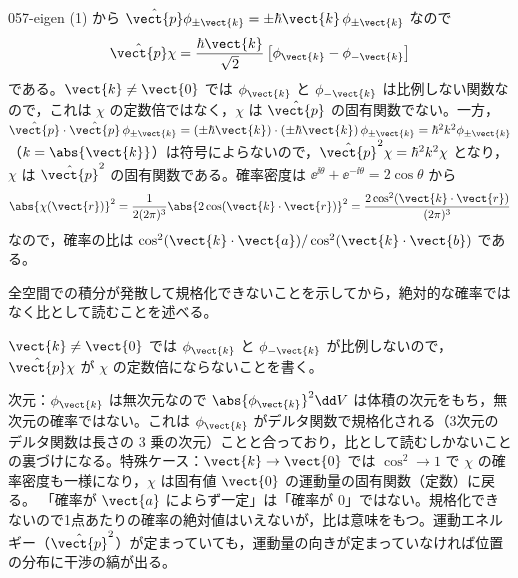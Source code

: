 \documentclass[uplatex,dvipdfmx,a4paper,11pt]{jsarticle}
\begin{document}
\begin{kaisetsu}{057-eigen}
 (1) から $\hat{\vect{p}}\phi_{\pm\vect{k}}=\pm\hbar\vect{k}\,\phi_{\pm\vect{k}}$ なので
\[ \hat{\vect{p}}\chi=\frac{\hbar\vect{k}}{\sqrt{2}}\left[\phi_{\vect{k}}-\phi_{-\vect{k}}\right] \]
である。$\vect{k}\neq\vect{0}$ では $\phi_{\vect{k}}$ と $\phi_{-\vect{k}}$ は比例しない関数なので，これは $\chi$ の定数倍ではなく，$\chi$ は $\hat{\vect{p}}$ の固有関数でない。一方，$\hat{\vect{p}}\cdot\hat{\vect{p}}\,\phi_{\pm\vect{k}}=(\pm\hbar\vect{k})\cdot(\pm\hbar\vect{k})\,\phi_{\pm\vect{k}}=\hbar^{2}k^{2}\phi_{\pm\vect{k}}$（$k=\abs{\vect{k}}$）は符号によらないので，$\hat{\vect{p}}^{2}\chi=\hbar^{2}k^{2}\chi$ となり，$\chi$ は $\hat{\vect{p}}^{2}$ の固有関数である。確率密度は $\ee^{\ii\theta}+\ee^{-\ii\theta}=2\cos\theta$ から
\[ \abs{\chi(\vect{r})}^{2}=\frac{1}{2(2\pi)^{3}}\abs{2\cos(\vect{k}\cdot\vect{r})}^{2}=\frac{2\cos^{2}(\vect{k}\cdot\vect{r})}{(2\pi)^{3}} \]
なので，確率の比は $\cos^{2}(\vect{k}\cdot\vect{a})/\cos^{2}(\vect{k}\cdot\vect{b})$ である。
\begin{ronten}
  \item {} 全空間での積分が発散して規格化できないことを示してから，絶対的な確率ではなく比として読むことを述べる。
  \item {} $\vect{k}\neq\vect{0}$ では $\phi_{\vect{k}}$ と $\phi_{-\vect{k}}$ が比例しないので，$\hat{\vect{p}}\chi$ が $\chi$ の定数倍にならないことを書く。
\end{ronten}
\kenzan 次元：$\phi_{\vect{k}}$ は無次元なので $\abs{\phi_{\vect{k}}}^{2}\dd V$ は体積の次元をもち，無次元の確率ではない。これは $\phi_{\vect{k}}$ がデルタ関数で規格化される（3次元のデルタ関数は長さの $3$ 乗の次元）ことと合っており，比として読むしかないことの裏づけになる。特殊ケース：$\vect{k}\to\vect{0}$ では $\cos^{2}\to1$ で $\chi$ の確率密度も一様になり，$\chi$ は固有値 $\vect{0}$ の運動量の固有関数（定数）に戻る。
\tsumazuki 「確率が $\vect{a}$ によらず一定」は「確率が $0$」ではない。規格化できないので1点あたりの確率の絶対値はいえないが，比は意味をもつ。運動エネルギー（$\hat{\vect{p}}^{2}$）が定まっていても，運動量の向きが定まっていなければ位置の分布に干渉の縞が出る。
\end{kaisetsu}
\end{document}
